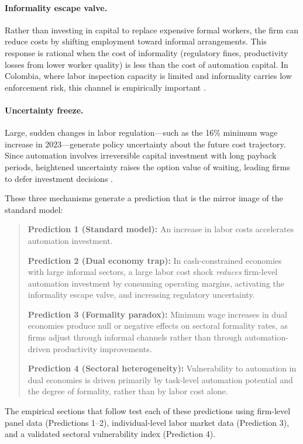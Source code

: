 \documentclass[5p,times,authoryear]{elsarticle}
\begin{document}
\paragraph{Informality escape valve.} Rather than investing in capital to replace expensive formal workers, the firm can reduce costs by shifting employment toward informal arrangements. This response is rational when the cost of informality (regulatory fines, productivity losses from lower worker quality) is less than the cost of automation capital. In Colombia, where labor inspection capacity is limited and informality carries low enforcement risk, this channel is empirically important \citep{ulyssea2018}.

\paragraph{Uncertainty freeze.} Large, sudden changes in labor regulation---such as the 16\% minimum wage increase in 2023---generate policy uncertainty about the future cost trajectory. Since automation involves irreversible capital investment with long payback periods, heightened uncertainty raises the option value of waiting, leading firms to defer investment decisions \citep{prettner2020innovation}.

These three mechanisms generate a prediction that is the mirror image of the standard model:

\begin{quote}
\textbf{Prediction 1 (Standard model):} An increase in labor costs accelerates automation investment.

\textbf{Prediction 2 (Dual economy trap):} In cash-constrained economies with large informal sectors, a large labor cost shock \emph{reduces} firm-level automation investment by consuming operating margins, activating the informality escape valve, and increasing regulatory uncertainty.

\textbf{Prediction 3 (Formality paradox):} Minimum wage increases in dual economies produce null or negative effects on sectoral formality rates, as firms adjust through informal channels rather than through automation-driven productivity improvements.

\textbf{Prediction 4 (Sectoral heterogeneity):} Vulnerability to automation in dual economies is driven primarily by task-level automation potential and the degree of formality, rather than by labor cost alone.
\end{quote}

The empirical sections that follow test each of these predictions using firm-level panel data (Predictions 1--2), individual-level labor market data (Prediction 3), and a validated sectoral vulnerability index (Prediction 4).
\end{document}
